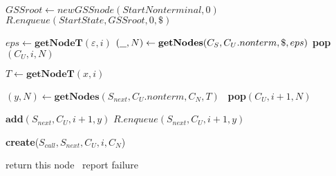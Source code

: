 \begin{algorithmic}
    \State $GSSroot\gets new GSSnode(StartNonterminal,0) $
    \State $R.enqueue(StartState, GSSroot, 0, \$)$
    
    \State $eps \gets \textbf{getNodeT}(\varepsilon, i)$  
    \State $(\underline{\hspace{0.25cm}}, N) \gets \textbf{getNodes}(C_{S},C_{U}.nonterm, \$, eps)$
    \State \textbf{pop}$(C_{U},i,N)$ 
    \EndIf
    
            \State $T \gets \textbf{getNodeT}(x, i)$
            
            \State $(y, N) \gets \textbf{getNodes}(S_{next},C_{U}.nonterm, C_{N}, T)$
                \ \textbf{pop}$(C_{U},i+1,N)$ 
            \EndIf
            
            \State $\textbf{add}(S_{next}, C_{U}, i + 1, y)$
            \Else
            \State $R.enqueue(S_{next}, C_{U}, i + 1, y)$
            \EndIf
        \EndCase
    
            \State \textbf{create}($S_{call}, S_{next}, C_{U}, i, C_{N}$)
        \EndCase
        \EndSwitch
        
    \EndFor
    \EndWhile
    \State return this node
    \Else
    \ report failure
    \EndIf
\EndFunction
\end{algorithmic}